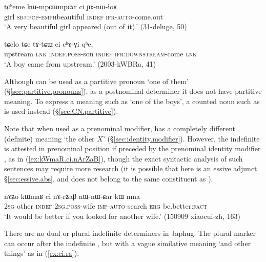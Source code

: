 \begin{exe}
\ex \label{ex:ci.indef}
\gll tɕʰeme kɯ-mpɕɯ\redp{}mpɕɤr ci ɲɤ-nɯ-ɬoʁ \\
girl \textsc{sbj}:\textsc{pcp}-\textsc{emph}\redp{}beautiful \textsc{indef} \textsc{ifr}-\textsc{auto}-come.out \\
\glt `A very beautiful girl appeared (out of it).' (31-deluge, 50)
\end{exe}

\begin{exe}
\ex \label{ex:ci.chAGi}
\gll tɕelo tɕe tɤ-tɕɯ ci cʰɤ-ɣi qʰe, \\
upstream \textsc{lnk} \textsc{indef}.\textsc{poss}-son \textsc{indef} \textsc{ifr}:\textsc{downstream}-come \textsc{lnk} \\
\glt `A boy came from upstream.' (2003-kWBRa, 41)
\end{exe}

Although  can be used as a partitive pronoun `one of them' (§\ref{sec:partitive.pronouns}), as a postnominal determiner it does not have partitive meaning. To express a meaning such as `one of the boys', a counted noun such as  is used instead (§\ref{sec:CN.partitive}). 

Note that when used as a prenominal modifier,  has a completely different (definite) meaning `the other $X$' (§\ref{sec:identity.modifier}). However, the indefinite  is attested in prenominal position if preceded by the prenominal identity modifier , as in (\ref{ex:kWmaR.ci.nArZaB}), though the exact syntactic analysis of such sentences may require more research (it is possible that  here is an essive adjunct §\ref{sec:essive.abs}, and does not belong to the same constituent as ).

\begin{exe}
\ex \label{ex:kWmaR.ci.nArZaB}
\gll  nɤʑo kɯmaʁ ci nɤ-rʑaβ nɯ-nɯ-ɕar kɯ mna  \\
\textsc{2sg} other \textsc{indef} \textsc{2sg}.\textsc{poss}-wife \textsc{imp}-\textsc{auto}-search \textsc{erg} be.better:\textsc{fact} \\
\glt `It would be better if you looked for another wife.' (150909 xiaocui-zh, 163)
\end{exe}

There are no dual or plural indefinite determiners in Japhug. The plural marker  can occur after the indefinite , but with a vague similative meaning `and other things' as in (\ref{ex:ci.ra}).

